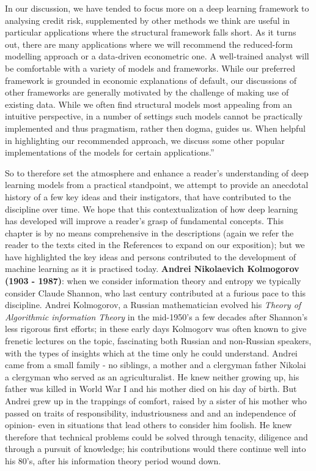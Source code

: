 \documentclass[7pt]{article}
\begin{document}
In our discussion, we have tended to focus more on a deep learning framework to analysing credit risk, supplemented by other methods we think are useful in particular applications where the structural framework falls short. As it turns out, there are many applications where we will recommend the reduced-form modelling approach or a data-driven econometric one. A well-trained analyst will be comfortable with a variety of models and frameworks. While our preferred framework is grounded in economic explanations of default, our discussions of other frameworks are generally motivated by the challenge of making use of existing data. While we often find structural models most appealing from an intuitive perspective, in a number of settings such models cannot be practically implemented and thus pragmatism, rather then dogma, guides us. When helpful in highlighting our recommended approach, we discuss some other popular implementations of the models for certain applications.”

So to therefore set the atmosphere and enhance a reader’s understanding of deep learning models from a practical standpoint, we attempt to provide an anecdotal history of a few key ideas and their instigators, that have contributed to the discipline over time. We hope that this contextualization of how deep learning has developed will improve a reader’s grasp of fundamental concepts. This chapter is by no means comprehensive in the descriptions (again we refer the reader to the texts cited in the References to expand on our exposition); but we have highlighted the key ideas and persons contributed to the development of machine learning as it is practised today.
\newpage
\textbf{Andrei Nikolaevich Kolmogorov (1903 - 1987)}: when we consider information theory and entropy we typically consider Claude Shannon, who last century contributed at a furious pace to this discipline. Andrei Kolmogorov, a Russian mathematician evolved his \textit{Theory of Algorithmic information Theory} in the mid-1950's a few decades after Shannon's less rigorous first efforts; in these early days Kolmogorv was often known to give frenetic lectures on the topic,  fascinating both Russian and non-Russian speakers, with the types of insights which at the time only he could understand. Andrei came from a small family - no siblings, a mother and a clergyman father Nikolai a clergyman who served as an agriculturalist. He knew neither growing up, his father was killed in World War I and his mother died on his day of birth. But Andrei grew up in the trappings of comfort, raised by a sister of his mother who passed on traits of responsibility, industriousness and and an independence of opinion- even in situations that lead others to consider him foolish. He knew therefore that technical problems could be solved through tenacity, diligence and through a pursuit of knowledge; his  contributions would there continue well into his 80's, after his information theory period wound down.    
\end{document}

